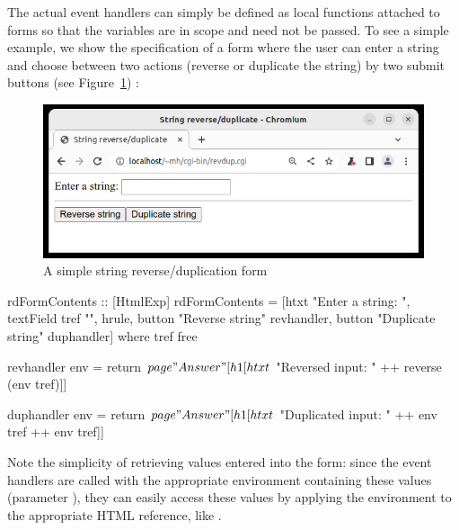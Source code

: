 The actual event handlers can simply be defined as local functions
attached to forms so that the  variables are in scope
and need not be passed.
To see a simple example, we show the specification of
a form where the user can enter a string and choose between two
actions (reverse or duplicate the string) by two submit buttons
(see Figure~\ref{fig-revdup}) :
%
\begin{figure}[t]
\begin{center}
\includegraphics[scale=0.6]{PICTURES/revdup.jpg}
\end{center}\vspace{-3ex}
\caption{A simple string reverse/duplication form\label{fig-revdup}}
\end{figure}
%
\begin{curry}
rdFormContents :: [HtmlExp]
rdFormContents =
  [htxt "Enter a string: ", textField tref "", hrule,
   button "Reverse string"   revhandler,
   button "Duplicate string" duphandler]
 where
   tref free

   revhandler env = return $ page "Answer"
     [h1 [htxt $ "Reversed input: " ++ reverse (env tref)]]

   duphandler env = return $ page "Answer"
     [h1 [htxt $ "Duplicated input: " ++ env tref ++ env tref]]
\end{curry}
%
Note the simplicity of retrieving values entered into the form:
since the event handlers are called with the appropriate environment
containing these values (parameter ),
they can easily access these values
by applying the environment to the appropriate HTML reference,
like .

